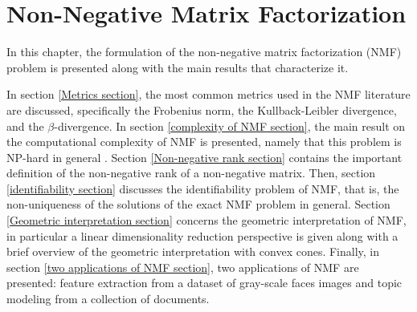 \chapter{Non-Negative Matrix Factorization}\label{NMF CHAPTER}
In this chapter, the formulation of the non-negative matrix factorization (NMF) problem is presented along with the main results that characterize it.
\par
In section \ref{Metrics section}, the most common metrics used in the NMF literature are discussed, specifically the Frobenius norm, the Kullback-Leibler divergence, and the $\beta$-divergence.
In section \ref{complexity of NMF section}, the main result on the computational complexity of NMF is presented, namely that this problem is NP-hard in general \cite{vavasis2007complexitynonnegativematrixfactorization}.
Section \ref{Non-negative rank section} contains the important definition of the non-negative rank of a non-negative matrix.
Then, section \ref{identifiability section} discusses the identifiability problem of NMF, that is, the non-uniqueness of the solutions of the exact NMF problem in general.
Section \ref{Geometric interpretation section} concerns the geometric interpretation of NMF, in particular a linear dimensionality reduction perspective is given along with a brief overview of the geometric interpretation with convex cones.
Finally, in section \ref{two applications of NMF section}, two applications of NMF are presented: feature extraction from a dataset of gray-scale faces images and topic modeling from a collection of documents.
